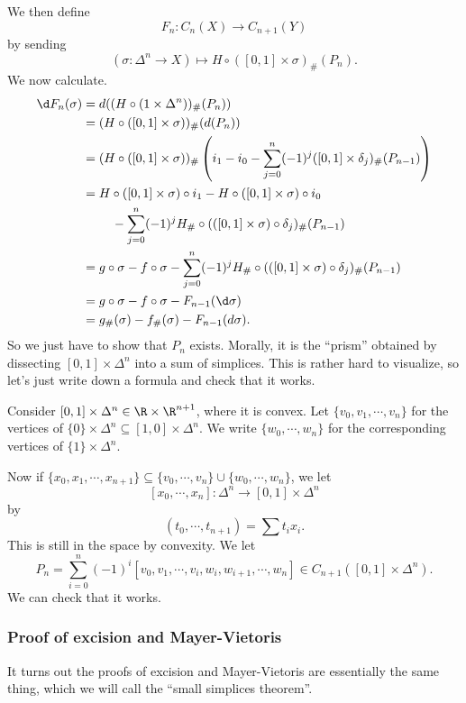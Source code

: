 \documentclass[a4paper]{article}
\begin{document}
We then define
\[
  F_n: C_n(X) \to C_{n + 1}(Y)
\]
by sending
\[
  (\sigma: \Delta^n \to X) \mapsto H \circ ([0, 1] \times \sigma)_\#(P_n).
\]
We now calculate.
\begin{align*}
  \d F_n(\sigma) ={}& d((H \circ (1 \times \Delta^n))_\#(P_n))\\
  ={}& (H \circ ([0, 1] \times \sigma))_\#(d(P_n))\\
  ={}& (H \circ ([0, 1] \times \sigma))_\# \left(i_1 - i_0 - \sum_{j = 0}^n (-1)^j ([0, 1] \times \delta_j)_\#(P_{n - 1})\right)\\
  ={}& H \circ ([0, 1] \times \sigma) \circ i_1 - H \circ ([0, 1] \times \sigma) \circ i_0 \\
  &\quad- \sum_{j = 0}^n (-1)^j H_\# \circ (([0, 1] \times \sigma) \circ \delta_j)_\# (P_{n - 1})\\
  ={}& g \circ \sigma - f \circ \sigma - \sum_{j = 0}^n (-1)^j H_\# \circ (([0, 1] \times \sigma) \circ \delta_j)_\# (P_{n - 1})\\
  ={}& g \circ \sigma - f \circ \sigma - F_{n - 1}(\d \sigma)\\
  ={}& g_\#(\sigma) - f_\#(\sigma) - F_{n - 1}(d\sigma).
\end{align*}
So we just have to show that $P_n$ exists. Morally, it is the ``prism'' obtained by dissecting $[0, 1] \times \Delta^n$ into a sum of simplices. This is rather hard to visualize, so let's just write down a formula and check that it works.

Consider $[0, 1] \times \Delta^n \in \R \times \R^{n + 1}$, where it is convex. Let $\{v_0, v_1, \cdots, v_n\}$ for the vertices of $\{0\} \times \Delta^n \subseteq [1, 0] \times \Delta^n$. We write $\{w_0, \cdots, w_n\}$ for the corresponding vertices of $\{1\} \times \Delta^n$.

Now if $\{x_0, x_1, \cdots, x_{n + 1}\} \subseteq \{v_0, \cdots, v_n\} \cup \{w_0, \cdots, w_n\}$, we let
\[
  [x_0, \cdots, x_n]: \Delta^n \to [0, 1] \times \Delta^n
\]
by
\[
  (t_0, \cdots, t_{n + 1}) = \sum t_i x_i.
\]
This is still in the space by convexity. We let
\[
  P_n = \sum_{i = 0}^n (-1)^i [v_0, v_1 , \cdots, v_i, w_i, w_{i + 1}, \cdots, w_n] \in C_{n + 1}([0, 1] \times \Delta^n).
\]
We can check that it works.

\subsubsection*{Proof of excision and Mayer-Vietoris}

It turns out the proofs of excision and Mayer-Vietoris are essentially the same thing, which we will call the ``small simplices theorem''.
\end{document}
